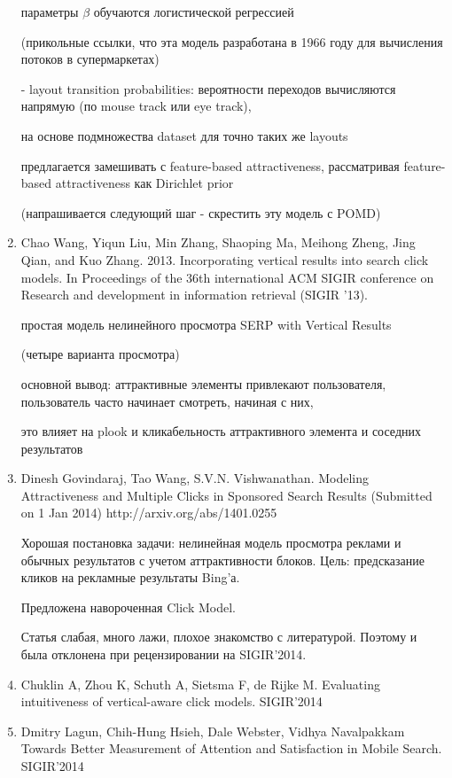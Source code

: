 \documentclass[12pt,a4paper]{article}
\begin{document}
\begin{enumerate}
	  параметры $\beta$ обучаются логистической регрессией

	  (прикольные ссылки, что эта модель разработана в 1966 году для вычисления потоков в супермаркетах)

	- layout transition probabilities: вероятности переходов вычисляются напрямую (по mouse track или eye track),

	  на основе подмножества dataset для точно таких же layouts

	  предлагается замешивать с feature-based attractiveness, рассматривая feature-based attractiveness как Dirichlet prior

  (напрашивается следующий шаг - скрестить эту модель с POMD)

\item Chao Wang, Yiqun Liu, Min Zhang, Shaoping Ma, Meihong Zheng, Jing Qian, and Kuo Zhang. 2013. Incorporating vertical results into search click models. In Proceedings of the 36th international ACM SIGIR conference on Research and development in information retrieval (SIGIR '13).

  простая модель нелинейного просмотра SERP with Vertical Results

  (четыре варианта просмотра)

  основной вывод: аттрактивные элементы привлекают пользователя, пользователь часто начинает смотреть, начиная с них,

  это влияет на plook и кликабельность аттрактивного элемента и соседних результатов

\item Dinesh Govindaraj, Tao Wang, S.V.N. Vishwanathan.
Modeling Attractiveness and Multiple Clicks in Sponsored Search Results
(Submitted on 1 Jan 2014)
http://arxiv.org/abs/1401.0255

 Хорошая постановка задачи: нелинейная модель просмотра реклами и обычных результатов с учетом аттрактивности блоков. Цель: предсказание кликов на рекламные результаты Bing'а.

 Предложена навороченная Click Model.

 Статья слабая, много лажи, плохое знакомство с литературой. Поэтому и была отклонена при рецензировании на SIGIR'2014.

\item Chuklin A, Zhou K, Schuth A, Sietsma F, de Rijke M. Evaluating intuitiveness of vertical-aware click models. SIGIR'2014

\item Dmitry Lagun, Chih-Hung Hsieh, Dale Webster, Vidhya Navalpakkam Towards Better Measurement of Attention and Satisfaction in Mobile Search. SIGIR'2014


\end{enumerate}
\end{document}
